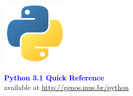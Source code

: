 \documentclass{article}
\begin{document}
\begin{minipage}[b]{0.1\linewidth}
\includegraphics[scale=.5]{python-logo}
\end{minipage}
\hfill
\begin{minipage}[b]{0.9\linewidth}
{\Huge \textcolor{blue}{\textsf{\textbf{Python 3.1 Quick Reference}}}} \\
{\large available at \url{http://genos.mus.br/python}} \\
\vspace{.8em}
\end{minipage}

\hrulefill
\end{document}
